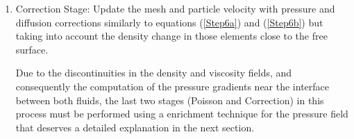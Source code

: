 \begin{enumerate}
\item Correction Stage: Update the mesh and particle velocity with pressure and diffusion corrections similarly to equations (\ref{Step6a}) and (\ref{Step6b}) but taking into account the density change in those elements close to the free surface.

    Due to the discontinuities in the density and viscosity fields, and consequently the computation of the pressure gradients near the interface between both fluids, the last two stages (Poisson and Correction) in this process must be performed using a enrichment technique for the pressure field that deserves a detailed explanation in the next section.

\end{enumerate}
